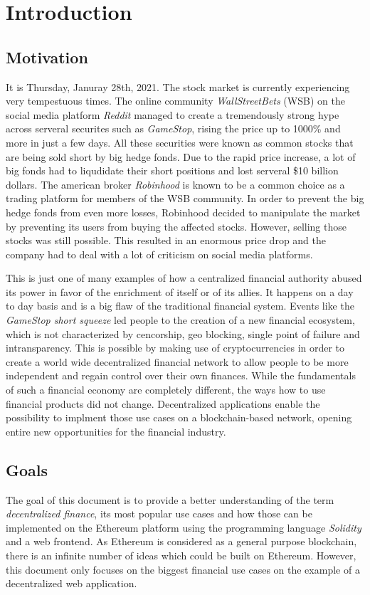 \chapter{Introduction}
\label{cha:Introduction}

\section{Motivation}
It is Thursday, Januray 28th, 2021. The stock market is currently experiencing very tempestuous times. The online community \textit{WallStreetBets} (WSB)
on the social media platform \textit{Reddit} managed to create a tremendously strong hype across serveral securites such as \textit{GameStop}, rising
the price up to 1000\% and more in just a few days. All these securities were known as common stocks that are being sold short by big hedge fonds.
Due to the rapid price increase, a lot of big fonds had to liqudidate their short positions and lost serveral \$10 billion dollars. The american
broker \textit{Robinhood} is known to be a common choice as a trading platform for members of the WSB community. In order to prevent the big hedge
fonds from even more losses, Robinhood decided to manipulate the market by preventing its users from buying the affected stocks. However, selling those
stocks was still possible. This resulted in an enormous price drop and the company had to deal with a lot of criticism on social media platforms.

This is just one of many examples of how a centralized financial authority abused its power in favor of the enrichment of itself or of its allies.
It happens on a day to day basis and is a big flaw of the traditional financial system. Events like the \textit{GameStop short squeeze} led people to
the creation of a new financial ecosystem, which is not characterized by cencorship, geo blocking, single point of failure and intransparency. This is
possible by making use of cryptocurrencies in order to create a world wide decentralized financial network to allow people to be more independent and
regain control over their own finances. While the fundamentals of such a financial economy are completely different, the ways how to use financial
products did not change. Decentralized applications enable the possibility to implment those use cases on a blockchain-based network, opening entire
new opportunities for the financial industry.

\section{Goals}
The goal of this document is to provide a better understanding of the term \textit{decentralized finance}, its most popular use cases and
how those can be implemented on the Ethereum platform using the programming language \textit{Solidity} and a web frontend. As Ethereum is considered
as a general purpose blockchain, there is an infinite number of ideas which could be built on Ethereum. However, this document only focuses on the
biggest financial use cases on the example of a decentralized web application.


